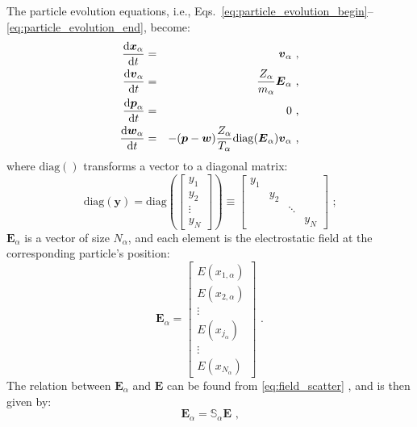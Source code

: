 \documentclass[12pt]{article}
\let\orgautoref\autoref
\renewcommand{\autoref}[1]
{%
    \def\equationautorefname{Eq.}%
    \def\figureautorefname{Fig.}%
    \def\subfigureautorefname{Fig.}%
    \def\sectionautorefname{Sec.}%
    \def\subsubsectionautorefname{Sec.}%
    \orgautoref{#1}%
}
\begin{document}
The particle evolution equations, i.e., Eqs.~\ref{eq:particle_evolution_begin}--\ref{eq:particle_evolution_end}, become:
\begin{eqnarray}
	\frac{\mathrm{d} \boldsymbol{x}_\alpha}{\mathrm{d} t} & = & \boldsymbol{v}_\alpha \textrm{ ,} \\
	\frac{\mathrm{d} \boldsymbol{v}_\alpha}{\mathrm{d} t} & = & \frac{Z_\alpha}{m_\alpha} \boldsymbol{E}_\alpha \textrm{ ,} \\
	\frac{\mathrm{d} \boldsymbol{p}_\alpha}{\mathrm{d} t} & = & 0 \textrm{ ,} \\
	\frac{\mathrm{d} \boldsymbol{w}_\alpha}{\mathrm{d} t} & = & -(\boldsymbol{p} - \boldsymbol{w}) \frac{Z_\alpha}{T_\alpha} \mathrm{diag} (\boldsymbol{E}_\alpha) \boldsymbol{v}_\alpha \textrm{ ,}
\end{eqnarray}
where $\mathrm{diag}()$ transforms a vector to a diagonal matrix:
\begin{equation}
	\mathrm{diag}(\boldsymbol{y}) = \mathrm{diag}( \left[ \begin{array}{c}
		y_1 \\
		y_2 \\
		\vdots \\
		y_N
	\end{array} \right] ) \equiv \left[ \begin{array}{cccc}
		y_1 & & & \\
		 & y_2 & & \\
		 & & \ddots & \\
		 & & & y_N
	\end{array} \right] \textrm{ ;}
\end{equation}
$\boldsymbol{E}_\alpha$ is a vector of size $N_\alpha$, and each element is the electrostatic field at the corresponding particle's position:
\begin{equation}
	\boldsymbol{E}_\alpha = \left[ \begin{array}{c}
		E(x_{1,\alpha}) \\
		E(x_{2,\alpha}) \\
		\vdots \\
		E(x_{j_\alpha}) \\
		\vdots \\
		E(x_{N_\alpha})
	\end{array} \right] \textrm{ .}
\end{equation}
The relation between $\boldsymbol{E}_\alpha$ and $\boldsymbol{E}$ can be found from \autoref{eq:field_scatter}, and is then given by:
\begin{equation}
	\boldsymbol{E}_\alpha = \mathbb{S}_\alpha \boldsymbol{E} \textrm{ ,}
\end{equation}
\end{document}
